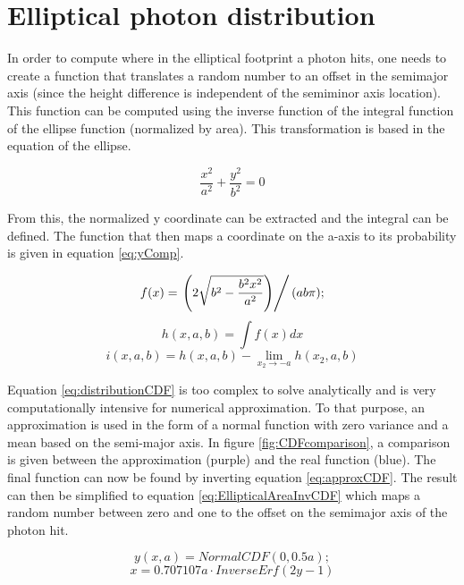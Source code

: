 \chapter{Elliptical photon distribution}
\label{EllipticalPhotonDistribution}

In order to compute where in the elliptical footprint a photon hits, one needs to create a function that translates a random number to an offset in the semimajor axis (since the height difference is independent of the semiminor axis location). This function can be computed using the inverse function of the integral function of the ellipse function (normalized by area). This transformation is based in the equation of the ellipse.

\begin{equation}
	\frac{x^2}{a^2}+\frac{y^2}{b^2}=0
\end{equation}

From this, the normalized y coordinate can be extracted and the integral can be defined. The function that then maps a coordinate on the a-axis to its probability is given in equation \ref{eq:yComp}.


\begin{equation}
	f(x) = \left. \left(2 \sqrt{b^2-\frac{b^2 x^2}{a^2}}\right)\right/(a b \pi);
	\label{eq:yComp}
\end{equation}
\begin{equation}
	h(x,a,b) = \int f(x) dx
\end{equation}
\begin{equation}
	i(x,a,b) = h(x,a,b)-\lim_{x_2\to-a} h(x_2,a,b)
	\label{eq:distributionCDF}
\end{equation}

Equation \ref{eq:distributionCDF} is too complex to solve analytically and is very computationally intensive for numerical approximation. To that purpose, an approximation is used in the form of a normal function with zero variance and a mean based on the semi-major axis. In figure \ref{fig:CDFcomparison}, a comparison is given between the approximation (purple) and the real function (blue). The final function can now be found by inverting equation \ref{eq:approxCDF}. The result can then be simplified to equation \ref{eq:EllipticalAreaInvCDF} which maps a random number between zero and one to the offset on the semimajor axis of the photon hit.

\begin{equation}
	y(x,a) = NormalCDF(0, 0.5a);
	\label{eq:approxCDF}
\end{equation}
\begin{equation}
	x = 0.707107 a \cdot InverseErf(2y-1)
	\label{eq:EllipticalAreaInvCDF}
\end{equation}

